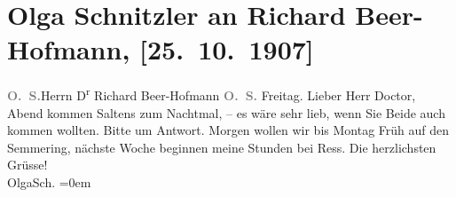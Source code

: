 

         
         \renewcommand{\erwaehntePersonen}{Personen: Richard Beer-Hofmann, Paula Beer-Hofmann, Johann Ress, Felix Salten, Ottilie Salten}
         \renewcommand{\erwaehnteOrte}{Orte: Semmering, Wien}
         \renewcommand{\erwaehnteWerke}{}
               \section[Olga Schnitzler an Richard Beer-Hofmann, {[}25. 10. 1907{]}]{ Olga Schnitzler an Richard Beer-Hofmann,
               {[}25. 10. 1907{]}}\nopagebreak{}\rehead{ }\begin{ledgroupsized}[t]{13cm}\normalsize\beginnumbering \toendnotes[C]{\smallbreak\pagebreak[2]} 
\toendnotes[C]{\smallbreak}\pstart{}{\pb}\textcolor{gray}{\textbf{O. S.}}\pend{}{\bigskip}\pstart{}{\pb}Herrn D\textsuperscript{r} Richard
                  Beer-Hofmann \pend{}{\bigskip}\pstart
           \noindent{}{\pb}\textcolor{gray}{\textbf{O. S.}}\pend
           \pstart
           Freitag.\pend
           \pstart
           Lieber Herr Doctor, \label{K_L01726_1v}\label{K_L01726_1h}{ }Abend kommen Saltens zum
               Nachtmal, – es wäre sehr lieb, wenn Sie Beide
               auch {\pb}kommen wollten. Bitte um Antwort. Morgen wollen
               wir bis Montag Früh auf den Semmering, nächste Woche
               beginnen meine Stunden bei Ress.\pend
           \pstart
           Die herzlichsten Grüsse!{\\[\baselineskip]}\spacefill\mbox{OlgaSch.}\pend
           \leftskip=0em{}
         
         \endnumbering{}\end{ledgroupsized}  \newcommand{\dateiname}{L01726}\newcommand{\titel}{Olga Schnitzler an Richard Beer-Hofmann, [25. 10. 1907]}\newcommand{\editorInnen}{Martin Anton Müller und Gerd-Hermann Susen}
      